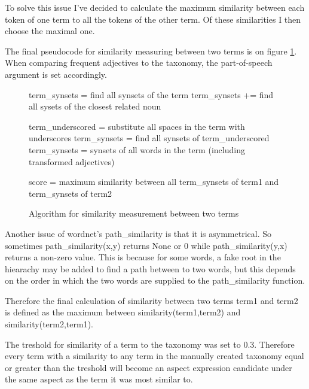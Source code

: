 To solve this issue I've decided to calculate the maximum similarity between each token of one term to all the tokens of the other term. Of these similarities I then choose the maximal one.

The final pseudocode for similarity measuring between two terms is on figure \ref{img:sim_alg}. When comparing frequent adjectives to the taxonomy, the part-of-speech argument is set accordingly.
\begin{figure}

\begin{algorithm}[H]
   {	
		{
		term\_synsets = find all synsets of the term \;
			{term\_synsets += find all sysets of the closest related noun}
	}

	\Else
		{ 
		term\_underscored = substitute all spaces in the term with underscores \;
		term\_synsets = find all synsets of term\_underscored \;
	}
		{
		term\_synsets = synsets of all words in the term (including transformed adjectives) \;
		}
}
score = maximum similarity between all term\_synsets of term1 and term\_synsets of term2 \;

\end{algorithm}
 \caption{Algorithm for similarity measurement between two terms}
	\label{img:sim_alg}
\end{figure}

Another issue of wordnet's path\_similarity is that it is asymmetrical. So sometimes path\_similarity(x,y) returns None or 0 while path\_similarity(y,x) returns a non-zero value. This is because for some words, a fake root in the hiearachy may be added to find a path between to two words, but this depends on the order in which the two words are supplied to the path\_similarity function. 

Therefore the final calculation of similarity between two terms term1 and term2 is defined as the maximum between similarity(term1,term2) and similarity(term2,term1).

The treshold for similarity of a term to the taxonomy was set to 0.3. Therefore every term with a similarity to any term in the manually created taxonomy equal or greater than the treshold will become an aspect expression candidate under the same aspect as the term it was most similar to.
